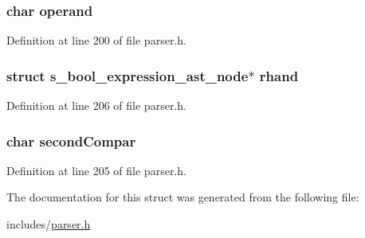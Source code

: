 \hypertarget{structs__bool__expression__ast__node_a3cad0d01b06faaf8fa705cf1e62daaa1}{
\subsubsection[{operand}]{\setlength{\rightskip}{0pt plus 5cm}char operand}}\label{structs__bool__expression__ast__node_a3cad0d01b06faaf8fa705cf1e62daaa1}


Definition at line 200 of file parser.\+h.

\hypertarget{structs__bool__expression__ast__node_a9d7296fe1a405bcfbdaf3e898e18d819}{
\subsubsection[{rhand}]{\setlength{\rightskip}{0pt plus 5cm}struct {\bf s\+\_\+bool\+\_\+expression\+\_\+ast\+\_\+node}$\ast$ rhand}}\label{structs__bool__expression__ast__node_a9d7296fe1a405bcfbdaf3e898e18d819}


Definition at line 206 of file parser.\+h.

\hypertarget{structs__bool__expression__ast__node_a4813880de07470a452adcd2bfa41030c}{
\subsubsection[{second\+Compar}]{\setlength{\rightskip}{0pt plus 5cm}char second\+Compar}}\label{structs__bool__expression__ast__node_a4813880de07470a452adcd2bfa41030c}


Definition at line 205 of file parser.\+h.



The documentation for this struct was generated from the following file\+:\begin{DoxyCompactItemize}
\item 
includes/\hyperlink{parser_8h}{parser.\+h}\end{DoxyCompactItemize}
